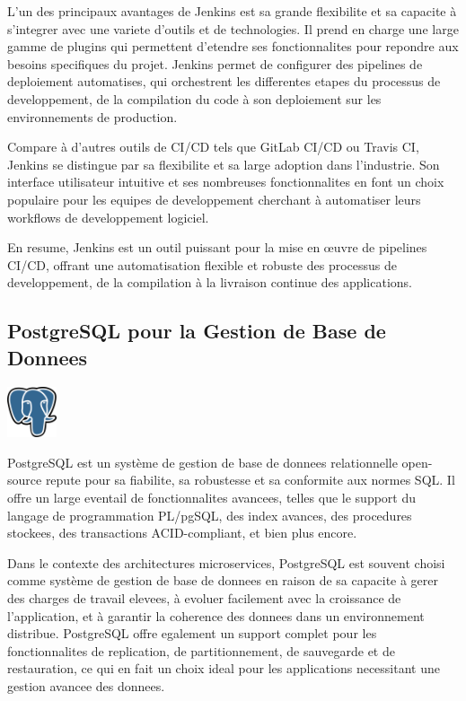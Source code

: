 \documentclass[a4paper, 11pt, openany]{report}
\begin{document}
L'un des principaux avantages de Jenkins est sa grande flexibilite et sa capacite à s'integrer avec une variete d'outils et de technologies. Il prend en charge une large gamme de plugins qui permettent d'etendre ses fonctionnalites pour repondre aux besoins specifiques du projet. Jenkins permet de configurer des pipelines de deploiement automatises, qui orchestrent les differentes etapes du processus de developpement, de la compilation du code à son deploiement sur les environnements de production.

Compare à d'autres outils de CI/CD tels que GitLab CI/CD ou Travis CI, Jenkins se distingue par sa flexibilite et sa large adoption dans l'industrie. Son interface utilisateur intuitive et ses nombreuses fonctionnalites en font un choix populaire pour les equipes de developpement cherchant à automatiser leurs workflows de developpement logiciel.

En resume, Jenkins est un outil puissant pour la mise en œuvre de pipelines CI/CD, offrant une automatisation flexible et robuste des processus de developpement, de la compilation à la livraison continue des applications.


\subsection{PostgreSQL pour la Gestion de Base de Donnees}
\begin{center}
\includegraphics[height=1.5cm]{postgres.png}
\end{center}

PostgreSQL est un système de gestion de base de donnees relationnelle open-source repute pour sa fiabilite, sa robustesse et sa conformite aux normes SQL. Il offre un large eventail de fonctionnalites avancees, telles que le support du langage de programmation PL/pgSQL, des index avances, des procedures stockees, des transactions ACID-compliant, et bien plus encore.

Dans le contexte des architectures microservices, PostgreSQL est souvent choisi comme système de gestion de base de donnees en raison de sa capacite à gerer des charges de travail elevees, à evoluer facilement avec la croissance de l'application, et à garantir la coherence des donnees dans un environnement distribue. PostgreSQL offre egalement un support complet pour les fonctionnalites de replication, de partitionnement, de sauvegarde et de restauration, ce qui en fait un choix ideal pour les applications necessitant une gestion avancee des donnees.
\end{document}
